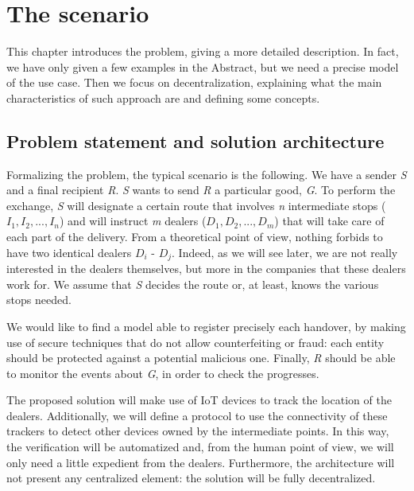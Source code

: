 \chapter{The scenario}
\label{cha:scenario}

This chapter introduces the problem, giving a more detailed description. In fact, we have only given a few examples in the Abstract, but we need a precise model of the use case. Then we focus on decentralization, explaining what the main characteristics of such approach are and defining some concepts.

\section{Problem statement and solution architecture}
\label{sec:statement}
Formalizing the problem, the typical scenario is the following. We have a sender \textit{S} and a final recipient \textit{R}. \textit{S} wants to send \textit{R} a particular good, \textit{G}. To perform the exchange, \textit{S} will designate a certain route that involves \textit{n} intermediate stops ($I_1, I_2, ..., I_n$) and will instruct \textit{m} dealers ($D_1, D_2, ..., D_m$) that will take care of each part of the delivery. From a theoretical point of view, nothing forbids to have two identical dealers $D_i$ - $D_j$. Indeed, as we will see later, we are not really interested in the dealers themselves, but more in the companies that these dealers work for. We assume that \textit{S} decides the route or, at least, knows the various stops needed.

We would like to find a model able to register precisely each handover, by making use of secure techniques that do not allow counterfeiting or fraud: each entity should be protected against a potential malicious one. Finally, \textit{R} should be able to monitor the events about \textit{G}, in order to check the progresses.

The proposed solution will make use of IoT devices to track the location of the dealers. Additionally, we will define a protocol to use the connectivity of these trackers to detect other devices owned by the intermediate points. In this way, the verification will be automatized and, from the human point of view, we will only need a little expedient from the dealers. Furthermore, the architecture will not present any centralized element: the solution will be fully decentralized.

